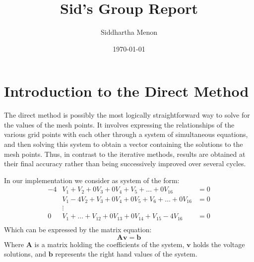 \documentclass[a4paper]{article}
\newcommand{\mat}[1]{\mathbf{#1}}
\renewcommand{\vec}[1]{\bm{#1}}
\begin{document}
\title{Sid's Group Report}
\author{Siddhartha Menon}
\date{\today}

\maketitle

\section{Introduction to the Direct Method}
The direct method is possibly the most logically straightforward way to solve
for the values of the mesh points. It involves expressing the relationships of
the various grid points with each other through a system of simultaneous
equations, and then solving this system to obtain a vector containing the
solutions to the mesh points. Thus, in contrast to the iterative methods,
results are obtained at their final accuracy rather than being successively
improved over several cycles.

In our implementation we consider as system of the form:
\begin{align*}
	-4&V_1+V_2+0V_3+0V_4+V_5+\dots+0V_{16}&=0\\
	&V_1-4V_2+V_3+0V_4+0V_5+V_6+\dots+0V_{16}&=0\\
	&\vdots\\
	0&V_1+\dots+V_{12}+0V_{13}+0V_{14}+V_{15}-4V_{16}&=0\\
\end{align*}
Which can be expressed by the matrix equation:
\begin{equation*}
	\mat{A}\vec{v}=\vec{b}
\end{equation*}
Where $\mat{A}$ is a matrix holding the coefficients of the system, $\vec{v}$
holds the voltage solutions, and $\vec{b}$ represents the right hand values of
the system.
\end{document}
